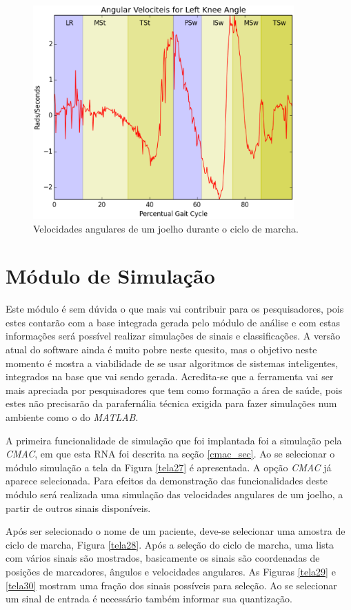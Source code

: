 \begin{figure}[ht]
	\centering
	\includegraphics[width=10cm]{figuras/tela26.eps}
	\caption{Velocidades angulares de um joelho durante o ciclo de marcha.}
\label{tela26}
\end{figure}





\goodbreak
\newpage
\clearpage
\section{Módulo de Simulação}
Este módulo é sem dúvida o que mais vai contribuir para os pesquisadores, pois estes contarão com a base integrada gerada pelo módulo de análise e com estas informações será possível realizar simulações de sinais e classificações. 
A versão atual do software ainda é muito pobre neste quesito, mas o objetivo neste momento é mostra a viabilidade de se usar algoritmos de sistemas inteligentes, integrados na base que vai sendo gerada.
Acredita-se que a ferramenta vai ser mais apreciada por pesquisadores que tem como formação a área de saúde, pois estes não precisarão da parafernália técnica exigida para fazer simulações num ambiente como o do \emph{MATLAB}.

A primeira funcionalidade de simulação que foi implantada foi a simulação pela \emph{CMAC}, em que esta RNA foi descrita na seção \ref{cmac_sec}. 
Ao se selecionar o módulo simulação a tela da Figura \ref{tela27} é apresentada. 
A opção \emph{CMAC} já aparece selecionada. 
Para efeitos da demonstração das funcionalidades deste módulo será realizada uma simulação das velocidades angulares de um joelho, a partir de outros sinais disponíveis.

Após ser selecionado o nome de um paciente, deve-se selecionar uma amostra de ciclo de marcha, Figura \ref{tela28}.
Após a seleção do ciclo de marcha, uma lista com vários sinais são mostrados, basicamente os sinais são coordenadas de posições de marcadores, ângulos e velocidades angulares. As Figuras \ref{tela29} e \ref{tela30} mostram uma fração dos sinais possíveis para seleção. Ao se selecionar um sinal de entrada é necessário também informar sua quantização.


